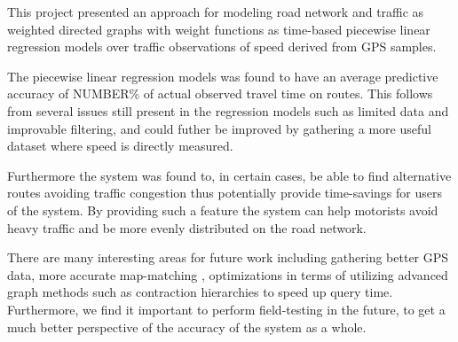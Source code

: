 This project presented an approach for modeling road network and traffic as weighted directed graphs with weight functions as time-based piecewise linear regression models over traffic observations of speed derived from GPS samples.

The piecewise linear regression models was found to have an average predictive accuracy of NUMBER\% of actual observed travel time on routes. This follows from several issues still present in the regression models such as limited data and improvable filtering, and could futher be improved by gathering a more useful dataset where speed is directly measured.

Furthermore the system was found to, in certain cases, be able to find alternative routes avoiding traffic congestion thus potentially provide time-savings for users of the system. By providing such a feature the system can help motorists avoid heavy traffic and be more evenly distributed on the road network.

There are many interesting areas for future work including gathering better GPS data, more accurate map-matching , optimizations in terms of utilizing advanced graph methods such as contraction hierarchies to speed up query time. Furthermore, we find it important to perform field-testing in the future, to get a much better perspective of the accuracy of the system as a whole.